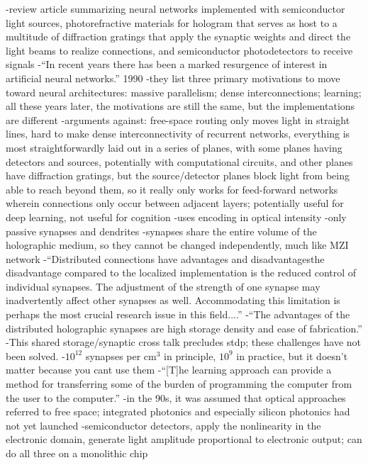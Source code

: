 \cite{psbr1990}
-review article summarizing neural networks implemented with semiconductor light sources, photorefractive materials for hologram that serves as host to a multitude of diffraction gratings that apply the synaptic weights and direct the light beams to realize connections, and semiconductor photodetectors to receive signals
-``In recent years there has been a marked resurgence of interest in artificial neural networks.'' 1990
-they list three primary motivations to move toward neural architectures: massive parallelism; dense interconnections; learning; all these years later, the motivations are still the same, but the implementations are different
-arguments against: free-space routing only moves light in straight lines, hard to make dense interconnectivity of recurrent networks, everything is most straightforwardly laid out in a series of planes, with some planes having detectors and sources, potentially with computational circuits, and other planes have diffraction gratings, but the source/detector planes block light from being able to reach beyond them, so it really only works for feed-forward networks wherein connections only occur between adjacent layers; potentially useful for deep learning, not useful for cognition
-uses encoding in optical intensity
-only passive synapses and dendrites
-synapses share the entire volume of the holographic medium, so they cannot be changed independently, much like MZI network
-``Distributed connections have advantages and disadvantages\textemdash the disadvantage compared to the localized implementation is the reduced control of individual synapses. The adjustment of the strength of one synapse may inadvertently affect other synapses as well. Accommodating this limitation is perhaps the most crucial research issue in this field....''
-``The advantages of the distributed holographic synapses are high storage density and ease of fabrication.''
-This shared storage/synaptic cross talk precludes stdp; these challenges have not been solved.
-$10^{12}$ synapses per cm$^3$ in principle, $10^9$ in practice, but it doesn't matter because you cant use them
-``[T]he learning approach can provide a method for transferring some of the burden of programming the computer from the user to the computer.''
-in the 90s, it was assumed that optical approaches referred to free space; integrated photonics and especially silicon photonics had not yet launched
-semiconductor detectors, apply the nonlinearity in the electronic domain, generate light amplitude proportional to electronic output; can do all three on a monolithic chip
